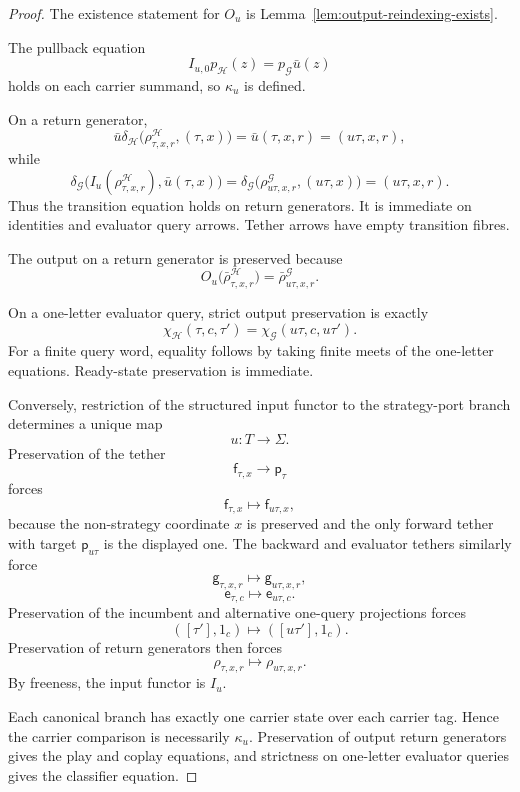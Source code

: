 \begin{proof}
The existence statement for \(O_u\) is
Lemma~\ref{lem:output-reindexing-exists}.

The pullback equation
\[
  I_{u,0}p_{\mathcal H}(z)
  =
  p_{\mathcal G}\bar u(z)
\]
holds on each carrier summand, so \(\kappa_u\) is defined.

On a return generator,
\[
  \bar u
  \delta_{\mathcal H}
  \bigl(
    \rho^{\mathcal H}_{\tau,x,r},
    (\tau,x)
  \bigr)
  =
  \bar u(\tau,x,r)
  =
  (u\tau,x,r),
\]
while
\[
  \delta_{\mathcal G}
  \bigl(
    I_u(\rho^{\mathcal H}_{\tau,x,r}),
    \bar u(\tau,x)
  \bigr)
  =
  \delta_{\mathcal G}
  \bigl(
    \rho^{\mathcal G}_{u\tau,x,r},
    (u\tau,x)
  \bigr)
  =
  (u\tau,x,r).
\]
Thus the transition equation holds on return generators. It is immediate on identities and
evaluator query arrows. Tether arrows have empty transition fibres.

The output on a return generator is preserved because
\[
  O_u
  \bigl(
    \bar\rho^{\mathcal H}_{\tau,x,r}
  \bigr)
  =
  \bar\rho^{\mathcal G}_{u\tau,x,r}.
\]

On a one-letter evaluator query, strict output preservation is exactly
\[
  \chi_{\mathcal H}(\tau,c,\tau')
  =
  \chi_{\mathcal G}(u\tau,c,u\tau').
\]
For a finite query word, equality follows by taking finite meets of the one-letter equations.
Ready-state preservation is immediate.

Conversely, restriction of the structured input functor to the strategy-port branch determines a
unique map
\[
  u:T\to\Sigma.
\]
Preservation of the tether
\[
  \mathsf f_{\tau,x}\to\mathsf p_\tau
\]
forces
\[
  \mathsf f_{\tau,x}\longmapsto\mathsf f_{u\tau,x},
\]
because the non-strategy coordinate \(x\) is preserved and the only forward tether with target
\(\mathsf p_{u\tau}\) is the displayed one. The backward and evaluator tethers similarly force
\[
  \mathsf g_{\tau,x,r}\longmapsto\mathsf g_{u\tau,x,r},
\]
\[
  \mathsf e_{\tau,c}\longmapsto\mathsf e_{u\tau,c}.
\]
Preservation of the incumbent and alternative one-query projections forces
\[
  ([\tau'],1_c)
  \longmapsto
  ([u\tau'],1_c).
\]
Preservation of return generators then forces
\[
  \rho_{\tau,x,r}
  \longmapsto
  \rho_{u\tau,x,r}.
\]
By freeness, the input functor is \(I_u\).

Each canonical branch has exactly one carrier state over each carrier tag. Hence the carrier
comparison is necessarily \(\kappa_u\). Preservation of output return generators gives the play and
coplay equations, and strictness on one-letter evaluator queries gives the classifier equation.
\end{proof}

